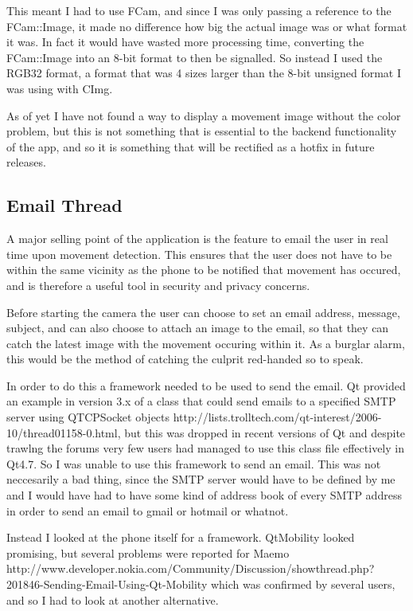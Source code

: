 This meant I had to use FCam, and since I was only passing a reference to the FCam::Image, it made no difference how big the actual image was or what format it was. In fact it would have wasted more processing time, converting the FCam::Image into an 8-bit format to then be signalled. So instead I used the RGB32 format, a format that was 4 sizes larger than the 8-bit unsigned format I was using with CImg. 

As of yet I have not found a way to display a movement image without the color problem, but this is not something that is essential to the backend functionality of the app, and so it is something that will be rectified as a hotfix in future releases.

\subsection{Email Thread}
A major selling point of the application is the feature to email the user in real time upon movement detection. This ensures that the user does not have to be within the same vicinity as the phone to be notified that movement has occured, and is therefore a useful tool in security and privacy concerns.

Before starting the camera the user can choose to set an email address, message, subject, and can also choose to attach an image to the email, so that they can catch the latest image with the movement occuring within it. As a burglar alarm, this would be the method of catching the culprit red-handed so to speak.

In order to do this a framework needed to be used to send the email.
Qt provided an example in version 3.x of a class that could send emails to a specified SMTP server using QTCPSocket objects http://lists.trolltech.com/qt-interest/2006-10/thread01158-0.html, but this was dropped in recent versions of Qt and despite trawlng the forums very few users had managed to use this class file effectively in Qt4.7. So I was unable to use this framework to send an email. This was not neccesarily a bad thing, since the SMTP server would have to be defined by me and I would have had to have some kind of address book of every SMTP address in order to send an email to gmail or hotmail or whatnot.

Instead I looked at the phone itself for a framework.  QtMobility looked promising, but several problems were reported for Maemo http://www.developer.nokia.com/Community/Discussion/showthread.php?201846-Sending-Email-Using-Qt-Mobility which was confirmed by several users, and so I had to look at another alternative.

